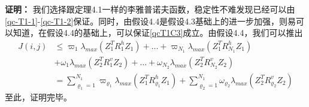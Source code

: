 	{\bf 证明：} 
	我们选择跟定理4.1一样的李雅普诺夫函数，稳定性不难发现已经可以由\eqref{qc-T1-1}-\eqref{qc-T1-2}保证。同时，由假设4.4是假设4.3基础上的进一步加强，则易可以知道，在假设4.4的基础上，可以保证\eqref{qcT1C3}成立。由假设4.4，我们可以推出
	\begin{equation}
		\begin{split}
			J(i,j)&\leq \varpi_1\lambda_{max}(Z^{T}_{1}R^{h}_{1}Z_{1})+\dots+\varpi_{N_{1}}\lambda_{max}(Z^{T}_{1}R^{h}_{N_{1}}Z_{1}) \\ 
			&+\omega_{1}\lambda_{max}(Z^{T}_{2}R^{v}_{1}Z_{2})+\dots+\omega_{N_{2}}\lambda_{max}(Z^{T}_{2}R^{v}_{N_2}Z_{2})\\
			&=\sum_{\varrho_{1}=1}^{N_{1}}\varpi_{\varrho_{1}}\lambda_{max}(Z^{T}_{1}R^{h}_{\varrho_{1}}Z_{1})
			+\sum_{\varrho_{2}=1}^{N_{1}}\omega_{\varrho_{2}}\lambda_{max}(Z^{T}_{2}R^{v}_{\varrho_{2}}Z_{2})
		\end{split}
	\end{equation}
	至此，证明完毕。
	
